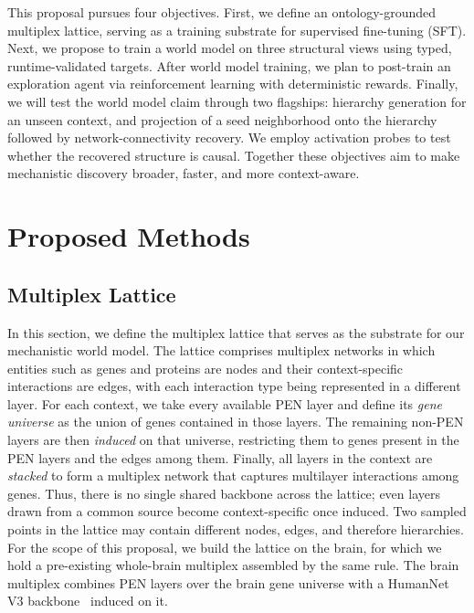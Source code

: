 \documentclass[thesis,letterpaper,12pt]{utthesis}
\begin{document}
This proposal pursues four objectives. First, we define an ontology-grounded multiplex lattice, serving as a training substrate for supervised fine-tuning (SFT). Next, we propose to train a world model on three structural views using typed, runtime-validated targets. After world model training, we plan to post-train an exploration agent via reinforcement learning with deterministic rewards. Finally, we will test the world model claim through two flagships: hierarchy generation for an unseen context, and projection of a seed neighborhood onto the hierarchy followed by network-connectivity recovery. We employ activation probes to test whether the recovered structure is causal. Together these objectives aim to make mechanistic discovery broader, faster, and more context-aware.

\section{Proposed Methods}
\subsection{Multiplex Lattice}\label{sec:ch4-lattice}
In this section, we define the multiplex lattice that serves as the substrate for our mechanistic world model. The lattice comprises multiplex networks in which entities such as genes and proteins are nodes and their context-specific interactions are edges, with each interaction type being represented in a different layer. For each context, we take every available PEN layer and define its \textit{gene universe} as the union of genes contained in those layers. The remaining non-PEN layers are then \textit{induced} on that universe, restricting them to genes present in the PEN layers and the edges among them. Finally, all layers in the context are \textit{stacked} to form a multiplex network that captures multilayer interactions among genes. Thus, there is no single shared backbone across the lattice; even layers drawn from a common source become context-specific once induced. Two sampled points in the lattice may contain different nodes, edges, and therefore hierarchies. For the scope of this proposal, we build the lattice on the brain, for which we hold a pre-existing whole-brain multiplex assembled by the same rule. The brain multiplex combines PEN layers over the brain gene universe with a HumanNet V3 backbone~\cite{humannet} induced on it.
\end{document}
